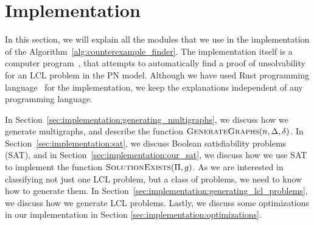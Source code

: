 
\section{Implementation} \label{sec:implementation}
In this section, we will explain all the modules that we use in the implementation of the Algorithm~\ref{alg:counterexample_finder}.
The implementation itself is a computer program~\cite{NonconstantLclClassifier2022}, that attempts to automatically find a proof of unsolvability for an LCL problem in the PN model.
Although we have used Rust programming language~\cite{RustLang} for the implementation, we keep the explanations independent of any programming language.

In Section~\ref{sec:implementation:generating_multigraphs}, we discuss how we generate multigraphs, and describe the function $\textsc{GenerateGraphs}(n, \Delta, \delta)$.
In Section~\ref{sec:implementation:sat}, we discuss Boolean satisfiability problems (SAT), and in Section~\ref{sec:implementation:our_sat}, we discuss how we use SAT to implement the function $\textsc{SolutionExists}(\Pi, g)$.
As we are interested in classifying not just one LCL problem, but a class of problems, we need to know how to generate them.
In Section~\ref{sec:implementation:generating_lcl_problems}, we discuss how we generate LCL problems.
Lastly, we discuss some optimizations in our implementation in Section \ref{sec:implementation:optimizations}.


